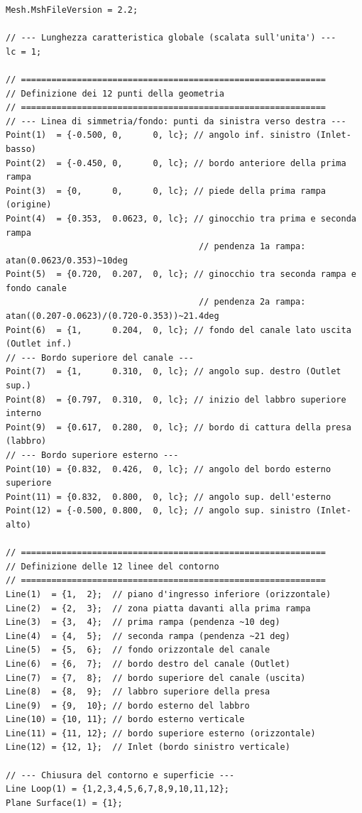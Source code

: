 \begin{lstlisting}[style=gmsh, caption={File \texttt{doppia\_presa\_reale.geo} -- geometria completa.}, label={lst:presa_reale}]
Mesh.MshFileVersion = 2.2;

// --- Lunghezza caratteristica globale (scalata sull'unita') ---
lc = 1;

// ============================================================
// Definizione dei 12 punti della geometria
// ============================================================
// --- Linea di simmetria/fondo: punti da sinistra verso destra ---
Point(1)  = {-0.500, 0,      0, lc}; // angolo inf. sinistro (Inlet-basso)
Point(2)  = {-0.450, 0,      0, lc}; // bordo anteriore della prima rampa
Point(3)  = {0,      0,      0, lc}; // piede della prima rampa (origine)
Point(4)  = {0.353,  0.0623, 0, lc}; // ginocchio tra prima e seconda rampa
                                      // pendenza 1a rampa: atan(0.0623/0.353)~10deg
Point(5)  = {0.720,  0.207,  0, lc}; // ginocchio tra seconda rampa e fondo canale
                                      // pendenza 2a rampa: atan((0.207-0.0623)/(0.720-0.353))~21.4deg
Point(6)  = {1,      0.204,  0, lc}; // fondo del canale lato uscita (Outlet inf.)
// --- Bordo superiore del canale ---
Point(7)  = {1,      0.310,  0, lc}; // angolo sup. destro (Outlet sup.)
Point(8)  = {0.797,  0.310,  0, lc}; // inizio del labbro superiore interno
Point(9)  = {0.617,  0.280,  0, lc}; // bordo di cattura della presa (labbro)
// --- Bordo superiore esterno ---
Point(10) = {0.832,  0.426,  0, lc}; // angolo del bordo esterno superiore
Point(11) = {0.832,  0.800,  0, lc}; // angolo sup. dell'esterno
Point(12) = {-0.500, 0.800,  0, lc}; // angolo sup. sinistro (Inlet-alto)

// ============================================================
// Definizione delle 12 linee del contorno
// ============================================================
Line(1)  = {1,  2};  // piano d'ingresso inferiore (orizzontale)
Line(2)  = {2,  3};  // zona piatta davanti alla prima rampa
Line(3)  = {3,  4};  // prima rampa (pendenza ~10 deg)
Line(4)  = {4,  5};  // seconda rampa (pendenza ~21 deg)
Line(5)  = {5,  6};  // fondo orizzontale del canale
Line(6)  = {6,  7};  // bordo destro del canale (Outlet)
Line(7)  = {7,  8};  // bordo superiore del canale (uscita)
Line(8)  = {8,  9};  // labbro superiore della presa
Line(9)  = {9,  10}; // bordo esterno del labbro
Line(10) = {10, 11}; // bordo esterno verticale
Line(11) = {11, 12}; // bordo superiore esterno (orizzontale)
Line(12) = {12, 1};  // Inlet (bordo sinistro verticale)

// --- Chiusura del contorno e superficie ---
Line Loop(1) = {1,2,3,4,5,6,7,8,9,10,11,12};
Plane Surface(1) = {1};
\end{lstlisting}

